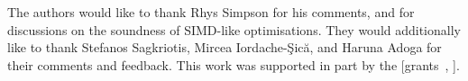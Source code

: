 \documentclass[
sigconf,natbib=false
]{acmart}
\begin{document}
\begin{acks}
	The authors would like to thank Rhys Simpson for his comments, and for discussions on the soundness of SIMD-like optimisations.
	They would additionally like to thank Stefanos Sagkriotis, Mircea Iordache-\c{S}ic\u{a}, and Haruna Adoga for their comments and feedback.
	This work was supported in part by the  [grants~, ].
\end{acks}
	
%
%
\printbibliography

\end{document}
